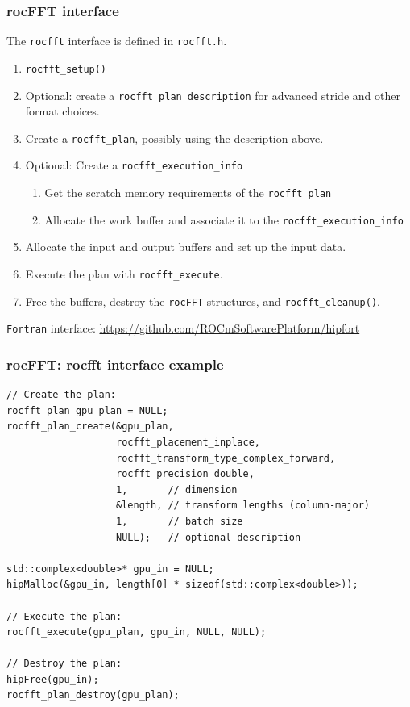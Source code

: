 \documentclass[10pt,aspectratio=169]{beamer}
\begin{document}
  
\begin{frame}
    \frametitle{rocFFT interface}

    \begin{center}
      The \texttt{rocfft} interface is defined in \texttt{rocfft.h}.
    \end{center}
    
    \begin{enumerate}
    \item \lstinline[]$rocfft_setup()$
    \item Optional: create a \lstinline[]$rocfft_plan_description$ for advanced stride and
      other format choices.
    \item Create a \lstinline[]$rocfft_plan$, possibly using the description above.
    \item Optional: Create a \lstinline[]$rocfft_execution_info$
      \begin{enumerate}
      \item Get the scratch memory requirements of the \lstinline[]$rocfft_plan$
      \item Allocate the work buffer and associate it to the \lstinline[]$rocfft_execution_info$
      \end{enumerate}
    \item Allocate the input and output buffers and set up the input data.
    \item Execute the plan with \lstinline[]$rocfft_execute$.
    \item Free the buffers, destroy the \texttt{rocFFT} structures, and
      \lstinline[]$rocfft_cleanup()$.
    \end{enumerate}

    \texttt{Fortran} interface: \url{https://github.com/ROCmSoftwarePlatform/hipfort}

\end{frame}

\begin{frame}[fragile]
    \frametitle{rocFFT: rocfft interface example}

\begin{lstlisting}
// Create the plan:
rocfft_plan gpu_plan = NULL;
rocfft_plan_create(&gpu_plan,    
                   rocfft_placement_inplace,
                   rocfft_transform_type_complex_forward,
                   rocfft_precision_double,
                   1,       // dimension
                   &length, // transform lengths (column-major)
                   1,       // batch size
                   NULL);   // optional description

std::complex<double>* gpu_in = NULL;
hipMalloc(&gpu_in, length[0] * sizeof(std::complex<double>));
                   
// Execute the plan:
rocfft_execute(gpu_plan, gpu_in, NULL, NULL);

// Destroy the plan:
hipFree(gpu_in);
rocfft_plan_destroy(gpu_plan);
\end{lstlisting}
\end{frame}
    
\end{document}
